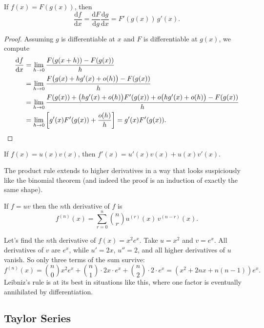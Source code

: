 \begin{theorem}
	If $f(x) = F(g(x))$, then
	$$
	\frac{\mathrm{d}f}{\mathrm{d}x} = \frac{\mathrm{d}F}{\mathrm{d}g} \frac{\mathrm{d}g}{\mathrm{d}x} = F'(g(x)) \, g'(x).
	$$
\end{theorem}
\begin{proof}
	Assuming $g$ is differentiable at $x$ and $F$ is differentiable at $g(x)$, we compute
	\begin{align*}
		\frac{\mathrm{d}f}{\mathrm{d}x} &= \lim_{h \to 0} \frac{F(g(x + h)) - F(g(x))}{h} \\
		&= \lim_{h \to 0} \frac{F\big(g(x) + h g'(x) + o(h)\big) - F(g(x))}{h} \\
		&= \lim_{h \to 0} \frac{F(g(x)) + \big(hg'(x) + o(h)\big) F'(g(x)) + o\big(hg'(x) + o(h)\big) - F(g(x))}{h} \\
		&= \lim_{h \to 0} \left[ g'(x) F'(g(x)) + \frac{o(h)}{h} \right] = g'(x)F'(g(x)). \qedhere
	\end{align*}
\end{proof}

\begin{theorem}
	If $f(x) = u(x) v(x)$, then $f'(x) = u'(x) v(x) + u(x) v'(x)$.
\end{theorem}

The product rule extends to higher derivatives in a way that looks suspiciously like the binomial theorem (and indeed the proof is an induction of exactly the same shape).

\begin{theorem}
	If $f = uv$ then the $n$th derivative of $f$ is
	$$
	f^{(n)}(x) = \sum_{r = 0}^{n} \binom{n}{r} u^{(r)}(x)\, v^{(n - r)}(x).
	$$
\end{theorem}

\begin{example}
	Let's find the $n$th derivative of $f(x) = x^2 e^x$. Take $u = x^2$ and $v = e^x$. All derivatives of $v$ are $e^x$, while $u' = 2x$, $u'' = 2$, and all higher derivatives of $u$ vanish. So only three terms of the sum survive:
	$$
	f^{(n)}(x) = \binom{n}{0}x^2 e^x + \binom{n}{1} \cdot 2x \cdot e^x + \binom{n}{2}\cdot 2 \cdot e^x = \left(x^2 + 2nx + n(n-1)\right)e^x.
	$$
	Leibniz's rule is at its best in situations like this, where one factor is eventually annihilated by differentiation.
\end{example}

\subsection{Taylor Series}


